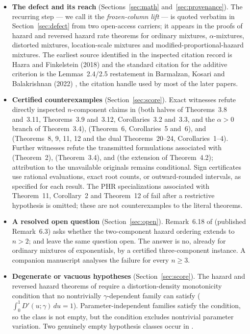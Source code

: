 \documentclass[10pt]{article}
\theoremstyle{plain}
\theoremstyle{definition}
\theoremstyle{remark}
\begin{document}
\begin{itemize}
\item[(a)] \textbf{The defect and its reach} (Sections~\ref{sec:math} and~\ref{sec:provenance}). The recurring step --- we call it the \emph{frozen-column lift} --- is quoted verbatim in Section~\ref{sec:defect} from two open-access carriers; it appears in the proofs of hazard and reversed hazard rate theorems for ordinary mixtures, $\alpha$-mixtures, distorted mixtures, location-scale mixtures and modified-proportional-hazard mixtures. The earliest source identified in the inspected citation record is Hazra and Finkelstein (2018) \cite{HazraFinkelstein2018} and the standard citation for the additive criterion is the Lemmas~2.4/2.5 restatement in Barmalzan, Kosari and Balakrishnan (2022) \cite{BarmalzanKosariBalakrishnan2022}, the citation handle used by most of the later papers.
\item[(b)] \textbf{Certified counterexamples} (Section~\ref{sec:score}). Exact witnesses refute directly inspected $n$-component claims in \cite{SahooKayalFinkelstein2026} (both halves of Theorems~3.8 and~3.11, Theorems~3.9 and~3.12, Corollaries~3.2 and~3.3, and the $\alpha>0$ branch of Theorem~3.4), \cite{GuoYan2024} (Theorem~6, Corollaries~5 and~6), and \cite{SahooKayalBalakrishnan2026} (Theorems~8, 9, 11, 12 and the dual Theorems~20--24, Corollaries~1--4). Further witnesses refute the transmitted formulations associated with \cite{BarmalzanKosariBalakrishnan2022} (Theorem~2), \cite{HazraFinkelstein2018} (Theorem~3.4), and \cite{NadebTorabi2022} (the extension of Theorem~4.2); attribution to the unavailable originals remains conditional. Sign certificates use rational evaluations, exact root counts, or outward-rounded intervals, as specified for each result. The PHR specializations associated with Theorem~11, Corollary~2 and Theorem~12 of \cite{ShekariEtAl2026} fail after a restrictive hypothesis is omitted; these are not counterexamples to the literal theorems.
\item[(c)] \textbf{A resolved open question} (Section~\ref{sec:open}). Remark~6.18 of \cite{ShojaeeAsadiFinkelstein2022} (published Remark~6.3) asks whether the two-component hazard ordering extends to $n>2$; \cite{HazraFinkelstein2018} and \cite{NadebTorabi2022} leave the same question open. The answer is no, already for ordinary mixtures of exponentials, by a certified three-component instance. A companion manuscript \cite{Guo2026hazard} analyses the failure for every $n\ge3$.
\item[(d)] \textbf{Degenerate or vacuous hypotheses} (Section~\ref{sec:score}). The hazard and reversed hazard theorems of \cite{ShekariEtAl2026} require a distortion-density monotonicity condition that no nontrivially $\gamma$-dependent family can satisfy ($\int_0^1 D'(u;\gamma)\,du=1$). Parameter-independent families satisfy the condition, so the class is not empty, but the condition excludes nontrivial parameter variation. Two genuinely empty hypothesis classes occur in \cite{BhaktaTorradoDasKayal2024}.

\end{itemize}
\end{document}

